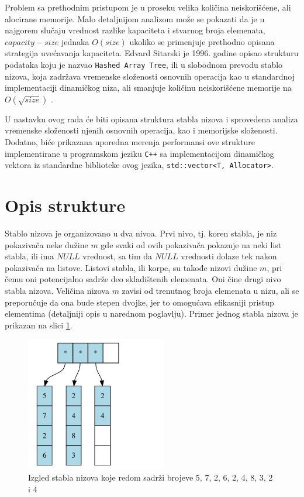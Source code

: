 \documentclass[a4paper]{article}
\begin{document}
Problem sa prethodnim pristupom je u proseku velika količina neiskorišćene, ali alocirane memorije. Malo detaljnijom analizom može se pokazati da je u najgorem slučaju vrednost razlike kapaciteta i stvarnog broja elemenata, $capacity - size$ jednaka $O(size)$ ukoliko se primenjuje prethodno opisana strategija uvećavanja kapaciteta. Edvard Sitarski je 1996. godine opisao strukturu podataka koju je nazvao \verb|Hashed Array Tree|, ili u slobodnom prevodu stablo nizova, koja zadržava vremenske složenosti osnovnih operacija kao u standardnoj implementaciji dinamičkog niza, ali smanjuje količinu neiskorišćene memorije na $O(\sqrt{size})$ \cite{hat-sitarski}.

U nastavku ovog rada će biti opisana struktura stabla nizova i sprovedena analiza vremenske složenosti njenih osnovnih operacija, kao i memorijske složenosti. Dodatno, biće prikazana uporedna merenja performansi ove strukture implementirane u programskom jeziku \verb|C++| sa implementacijom dinamičkog vektora iz standardne biblioteke ovog jezika, \verb|std::vector<T, Allocator>|.

\section{Opis strukture}

Stablo nizova je organizovano u dva nivoa. Prvi nivo, tj. koren stabla, je niz pokazivača neke dužine $m$ gde svaki od ovih pokazivača pokazuje na neki list stabla, ili ima $NULL$ vrednost, sa tim da $NULL$ vrednosti dolaze tek nakon pokazivača na listove. Listovi stabla, ili korpe, su takođe nizovi dužine $m$, pri čemu oni potencijalno sadrže deo skladištenih elemenata. Oni čine drugi nivo stabla nizova. Veličina nizova $m$ zavisi od trenutnog broja elemenata u nizu, ali se preporučuje da ona bude stepen dvojke, jer to omogućava efikasniji pristup elementima (detaljniji opis u narednom poglavlju). Primer jednog stabla nizova je prikazan na slici \ref{fig:hat-struktura-primer}.

\begin{figure}[h!]
    \centering
    \includegraphics[width=0.55\textwidth]{ilustracije/hat-struktura-primer.png}
    \caption{Izgled stabla nizova koje redom sadrži brojeve 5, 7, 2, 6, 2, 4, 8, 3, 2 i 4}
    \label{fig:hat-struktura-primer}
\end{figure}
\end{document}
